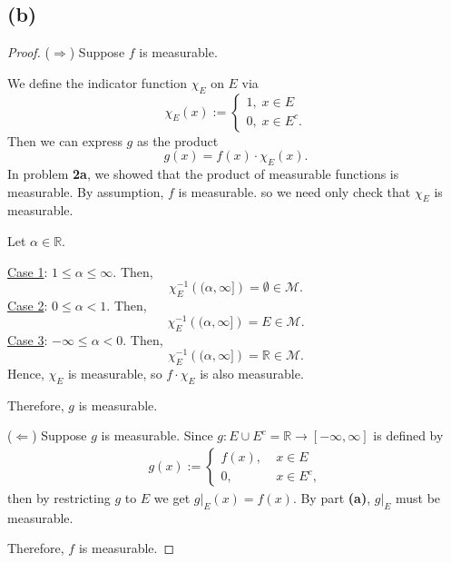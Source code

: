 \documentclass{article}
\newcommand{\R}{\mathbb{R}} %
\newcommand{\M}{\mathcal{M}} %
\begin{document}
\subsection*{(b)}
\begin{proof}
	($\Rightarrow$) Suppose $f$ is measurable.
	
	We define the indicator function $\chi_E$ on $E$ via
	\begin{equation}
		\chi_E(x) := 
		\begin{cases}
			1, \; x \in E \\
			0, \; x \in E^c.
		\end{cases}
	\end{equation}
	Then we can express $g$ as the product
	\begin{equation}
		g(x) = f(x) \cdot \chi_E(x).
	\end{equation}
	In problem \textbf{2a}, we showed that the product of measurable functions is measurable. By assumption, $f$ is measurable. so we need only check that $\chi_E$ is measurable.
	
	Let $\alpha \in \R$. 
	
	\underline{Case 1}: $1 \leq \alpha \leq \infty$. Then,
	\begin{equation}
		\chi_E ^{-1}\left((\alpha, \infty]\right) = \emptyset \in \M.
	\end{equation}
	\underline{Case 2}: $0 \leq \alpha < 1$. Then,
	\begin{equation}
		\chi_E^{-1}\left((\alpha,\infty]\right) = E \in \M.
	\end{equation}
	\underline{Case 3}: $-\infty \leq \alpha < 0$. Then,
	\begin{equation}
		\chi_E^{-1}\left((\alpha, \infty]\right) = \R \in \M.
	\end{equation}
	 Hence, $\chi_E$ is measurable, so $f\cdot \chi_E$ is also measurable.
	 
	 Therefore, $g$ is measurable.
	 
	 ($\Leftarrow$) Suppose $g$ is measurable. Since $g: E\cup E^c = \R \rightarrow [-\infty, \infty]$ is defined by
	 \begin{align}
	 	g(x) := 
	 	\begin{cases}
	 		f(x), \; &x \in E \\
	 		0, \; &x \in E^c,
	 	\end{cases}
	 \end{align}
	 then by restricting $g$ to $E$ we get $g\big|_E(x) = f(x)$. By part \textbf{(a)}, $g\big|_E$ must be measurable.
	 
	 Therefore, $f$ is measurable.
\end{proof}
\end{document}
